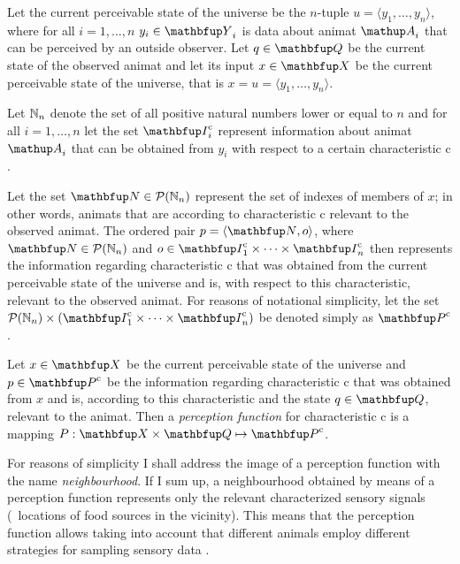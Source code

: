 Let the current perceivable state of the universe be the $n$-tuple  $u=\langle y_1,\ldots,y_n\rangle$, where for all $i=1,\ldots,n$ $y_i \in \set{Y}_i$ is data about animat $\autom{A}_i$ that can be perceived by an outside observer. Let $q \in \set{Q}$ be the current state of the observed animat and let its input $x \in \set{X}$ be the current perceivable state of the universe, that is  $x=u=\langle y_1,\ldots,y_n \rangle$. 

Let $\mathbb{N}_n$ denote the set of all positive natural numbers lower or equal to $n$ and for all $i=1,\ldots,n$ let the set $\set{I}^\textnormal{c}_i$ represent information about animat $\autom{A}_i$ that can be obtained from $y_i$ with respect to a certain characteristic $\mathrm{c}$. 

Let the set $\set{N} \in \powset{\N_n}$ represent the set of indexes of members of $x$; in other words, animats that are according to characteristic $\mathrm{c}$ relevant to the observed animat. The ordered pair $p=\langle\set{N},o\rangle$, where $\set{N} \in \powset{\N_n}$ and $o \in \set{I}^\textnormal{c}_1 \times \cdots \times \set{I}^\textnormal{c}_n$ then represents the information regarding characteristic $\mathrm{c}$ that was obtained from the current perceivable state of the universe and is, with respect to this characteristic, relevant to the observed animat. For reasons of notational simplicity, let the set $\powset{\N_n} \times (\set{I}^\textnormal{c}_1 \times \cdots \times \set{I}^\textnormal{c}_n)$ be denoted simply as $\set{P}^\textnormal{c}$. 

\begin{definition}
\label{def:animat:Pi}
Let $x \in \set{X}$ be the current perceivable state of the universe and $p \in \set{P}^\textnormal{c}$ be the information regarding characteristic $\mathrm{c}$ that was obtained from $x$ and is, according to this characteristic and the state $q \in \set{Q}$, relevant to the animat. Then a \emph{perception function} for characteristic $\mathrm{c}$ is a mapping $P: \set{X} \times \set{Q} \mapsto \set{P}^\textnormal{c}$.
\end{definition}

For reasons of simplicity I shall address the image of a perception function with the name \emph{neighbourhood}. If I sum up, a neighbourhood obtained by means of a perception function represents only the relevant characterized sensory signals (\eg\ locations of food sources in the vicinity). This means that the perception function allows taking into account that different animals employ different strategies for sampling sensory data \cite{cliff:1993}. 

